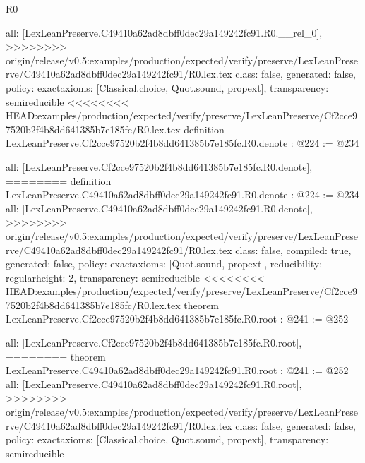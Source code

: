 \begin{lexlean}{R0}
\begin{coremodule}
{{{{  all: [LexLeanPreserve.C49410a62ad8dbff0dec29a149242fc91.R0.__rel_0],
>>>>>>>> origin/release/v0.5:examples/production/expected/verify/preserve/LexLeanPreserve/C49410a62ad8dbff0dec29a149242fc91/R0.lex.tex
  class: false,
  generated: false,
  policy: exact{axioms: [Classical.choice, Quot.sound, propext]},
  transparency: semireducible
}
<<<<<<<< HEAD:examples/production/expected/verify/preserve/LexLeanPreserve/Cf2cce97520b2f4b8dd641385b7e185fc/R0.lex.tex
definition LexLeanPreserve.Cf2cce97520b2f4b8dd641385b7e185fc.R0.denote : @224 := @234 {
  all: [LexLeanPreserve.Cf2cce97520b2f4b8dd641385b7e185fc.R0.denote],
========
definition LexLeanPreserve.C49410a62ad8dbff0dec29a149242fc91.R0.denote : @224 := @234 {
  all: [LexLeanPreserve.C49410a62ad8dbff0dec29a149242fc91.R0.denote],
>>>>>>>> origin/release/v0.5:examples/production/expected/verify/preserve/LexLeanPreserve/C49410a62ad8dbff0dec29a149242fc91/R0.lex.tex
  class: false,
  compiled: true,
  generated: false,
  policy: exact{axioms: [Quot.sound, propext]},
  reducibility: regular{height: 2},
  transparency: semireducible
}
<<<<<<<< HEAD:examples/production/expected/verify/preserve/LexLeanPreserve/Cf2cce97520b2f4b8dd641385b7e185fc/R0.lex.tex
theorem LexLeanPreserve.Cf2cce97520b2f4b8dd641385b7e185fc.R0.root : @241 := @252 {
  all: [LexLeanPreserve.Cf2cce97520b2f4b8dd641385b7e185fc.R0.root],
========
theorem LexLeanPreserve.C49410a62ad8dbff0dec29a149242fc91.R0.root : @241 := @252 {
  all: [LexLeanPreserve.C49410a62ad8dbff0dec29a149242fc91.R0.root],
>>>>>>>> origin/release/v0.5:examples/production/expected/verify/preserve/LexLeanPreserve/C49410a62ad8dbff0dec29a149242fc91/R0.lex.tex
  class: false,
  generated: false,
  policy: exact{axioms: [Classical.choice, Quot.sound, propext]},
  transparency: semireducible
}

}}}}}
\end{coremodule}
\end{lexlean}

